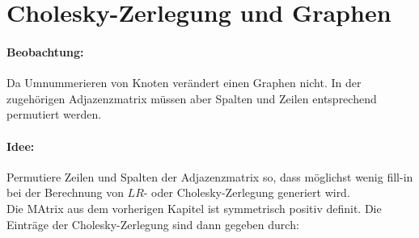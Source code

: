 \section{Cholesky-Zerlegung und Graphen}
\paragraph{Beobachtung:} Da Umnummerieren von Knoten verändert einen Graphen nicht.
In der zugehörigen Adjazenzmatrix müssen aber Spalten und Zeilen entsprechend permutiert werden.
\paragraph{Idee:} Permutiere Zeilen und Spalten der Adjazenzmatrix so, dass möglichst wenig fill-in bei der Berechnung von $LR$- oder Cholesky-Zerlegung generiert wird.\\
Die MAtrix aus dem vorherigen Kapitel ist symmetrisch positiv definit. Die Einträge der Cholesky-Zerlegung sind dann gegeben durch:
